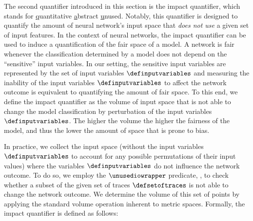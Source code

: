 The second quantifier introduced in this section is the \qlibraname{} impact quantifier, which stands for \underline{q}uantitative \underline{a}bstract \underline{u}nused.
Notably, this quantifier is designed to quantify the amount of neural network's input space that \emph{does not use} a given set of input features.
In the context of neural networks, the \qlibraname{} impact quantifier can be used to induce a quantification of the fair space of a model.
A network is fair whenever the classification determined by a model does not depend on the ``sensitive'' input variables.
In our setting, the sensitive input variables are represented by the set of input variables $\definputvariables$ and measuring the inability of the input variables $\definputvariables$ to affect the network outcome is equivalent to quantifying the amount of fair space.
To this end, we define the \qlibraname{} impact quantifier as the volume of input space that is not able to change the model classification by perturbation of the input variables $\definputvariables$.
The higher the volume the higher the fairness of the model, and thus the lower the amount of space that is prone to bias.

In practice, we collect the input space (without the input variables $\definputvariables$ to account for any possible permutations of their input values) where the variables $\definputvariables$ do not influence the network outcome.
To do so, we employ the $\unusediowrapper$ predicate, \cf{} , to check whether a subset of the given set of traces $\defsetoftraces$ is not able to change the network outcome.
We determine the volume of this set of points by applying the standard volume operation inherent to metric spaces.
Formally, the \qlibraname{} impact quantifier is defined as follows:

